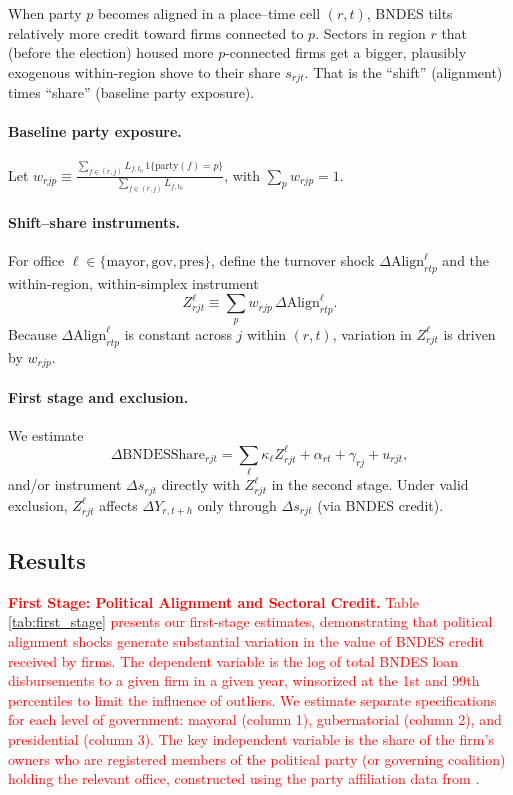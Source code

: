\documentclass{article}
\begin{document}
When party $p$ becomes aligned in a place–time cell
$(r,t)$, BNDES tilts relatively more credit toward firms connected to $p$. Sectors in region $r$ that (before the election) housed more $p$-connected firms get a bigger, plausibly exogenous within-region shove to their share $s_{rjt}$. That is the “shift” (alignment) times “share” (baseline party exposure).

\newcommand{\Align}{\mathrm{Align}}

\paragraph{Baseline party exposure.}
Let $w_{rjp} \equiv \frac{\sum_{f\in(r,j)} L_{f,t_0}\,1\{\text{party}(f)=p\}}{\sum_{f\in(r,j)} L_{f,t_0}}$, with $\sum_p w_{rjp}=1$.

\paragraph{Shift–share instruments.}
For office $\ell\in\{\mathrm{mayor},\mathrm{gov},\mathrm{pres}\}$, define the turnover shock
$\Delta \Align^{\ell}_{rtp}$ and the within-region, within-simplex instrument
\[
    Z^{\ell}_{rjt} \equiv \sum_{p} w_{rjp}\,\Delta \Align^{\ell}_{rtp}.
\]
Because $\Delta \Align^{\ell}_{rtp}$ is constant across $j$ within $(r,t)$, variation in $Z^{\ell}_{rjt}$ is driven by $w_{rjp}$.

\paragraph{First stage and exclusion.}
We estimate
\[
    \Delta \text{BNDESShare}_{rjt} = \sum_{\ell} \kappa_{\ell} Z^{\ell}_{rjt} + \alpha_{rt} + \gamma_{rj} + u_{rjt},
\]
and/or instrument $\Delta s_{rjt}$ directly with $Z^{\ell}_{rjt}$ in the second stage.
Under valid exclusion, $Z^{\ell}_{rjt}$ affects $\Delta Y_{r,t+h}$ only through $\Delta s_{rjt}$ (via BNDES credit).

\subsection{Results}\label{sec:results}

\textcolor{red}{\textbf{First Stage: Political Alignment and Sectoral Credit.} Table \ref{tab:first_stage} presents our first-stage estimates, demonstrating that political alignment shocks generate substantial variation in the value of BNDES credit received by firms. The dependent variable is the log of total BNDES loan disbursements to a given firm in a given year, winsorized at the 1st and 99th percentiles to limit the influence of outliers. We estimate separate specifications for each level of government: mayoral (column 1), gubernatorial (column 2), and presidential (column 3). The key independent variable is the share of the firm's owners who are registered members of the political party (or governing coalition) holding the relevant office, constructed using the party affiliation data from \citet{colonnelli2025politics}.}
\end{document}
